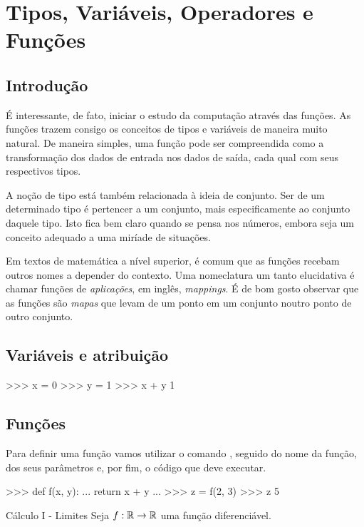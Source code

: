 \chapter{Tipos, Variáveis, Operadores e Funções}

	\section*{Introdução}%
	É interessante, de fato, iniciar o estudo da computação através das funções. As funções trazem consigo os conceitos de tipos e variáveis de maneira muito natural. De maneira simples, uma função pode ser compreendida como a transformação dos dados de entrada nos dados de saída, cada qual com seus respectivos tipos. \par
	
	A noção de tipo está também relacionada à ideia de conjunto. Ser de um determinado tipo é pertencer a um conjunto, mais especificamente ao conjunto daquele tipo. Isto fica bem claro quando se pensa nos números, embora seja um conceito adequado a uma miríade de situações. \par
	
	Em textos de matemática a nível superior, é comum que as funções recebam outros nomes a depender do contexto. Uma nomeclatura um tanto elucidativa é chamar funções de \textit{aplicações}, em inglês, \textit{mappings}. É de bom gosto observar que as funções são \textit{mapas} que levam de um ponto em um conjunto noutro ponto de outro conjunto. \par

	\section*{Variáveis e atribuição}%
	\begin{lstpython}
	>>> x = 0
	>>> y = 1
	>>> x + y
	1
	\end{lstpython}

	\section*{Funções}%
	Para definir uma função vamos utilizar o comando , seguido do nome da função, dos seus parâmetros e, por fim, o código que deve executar.
	\begin{lstpython}
	>>> def f(x, y):
	...		return x + y
	...
	>>> z = f(2, 3)
	>>> z
	5
	\end{lstpython}

    \begin{problem}{Cálculo I - Limites}
		Seja $f : \mathbb{R} \to \mathbb{R} $ uma função diferenciável.
	\end{problem}


